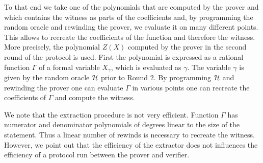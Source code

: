 \documentclass[runningheads]{llncs}
\theoremstyle{definition}
\begin{document}
To that end we take one of the polynomials that are computed by the prover and which contains the witness as parts of the coefficients and, by programming the random oracle and rewinding the prover, we evaluate it on many different points. This allows to recreate the coefficients of the function and therefore the witness.  
%
More precisely, the polynomial $Z(X)$ computed by the prover in the second round of the protocol is used. First the polynomial is expressed as a rational function $\Gamma$ of a formal variable $X_\gamma$, which is evaluated as $\gamma$. 
The variable $\gamma$ is given by the random oracle $\mathcal{H}$ prior to Round 2. 
By programming $\mathcal{H}$ and rewinding the prover one can evaluate $\Gamma$ in various points one can recreate the coefficients of $\Gamma$ and compute the witness. 

We note that the extraction procedure is not very efficient. Function $\Gamma$ has numerator and denominator polynomials of degrees linear to the size of the statement. Thus a linear number of rewinds is necessary to recreate the witness.
However, we point out that the efficiency of the extractor does not influences the efficiency of a protocol run between the prover and verifier.
\end{document}
